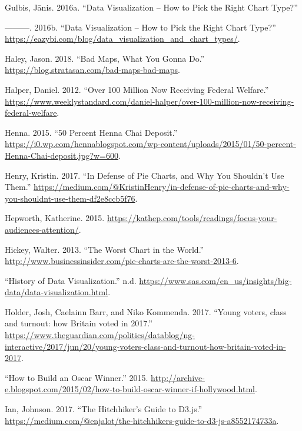 \documentclass[]{book}
\begin{document}
\leavevmode\hypertarget{ref-chart_selection}{}%
Gulbis, Jānis. 2016a. ``Data Visualization -- How to Pick the Right Chart Type?''

\leavevmode\hypertarget{ref-pick_chart}{}%
---------. 2016b. ``Data Visualization -- How to Pick the Right Chart Type?'' \url{https://eazybi.com/blog/data_visualization_and_chart_types/}.

\leavevmode\hypertarget{ref-good_bad_maps_tips}{}%
Haley, Jason. 2018. ``Bad Maps, What You Gonna Do.'' \url{https://blog.stratasan.com/bad-maps-bad-maps}.

\leavevmode\hypertarget{ref-halper_2012}{}%
Halper, Daniel. 2012. ``Over 100 Million Now Receiving Federal Welfare.'' \url{https://www.weeklystandard.com/daniel-halper/over-100-million-now-receiving-federal-welfare}.

\leavevmode\hypertarget{ref-50-percent-Henna-Chai}{}%
Henna. 2015. ``50 Percent Henna Chai Deposit.'' \url{https://i0.wp.com/hennablogspot.com/wp-content/uploads/2015/01/50-percent-Henna-Chai-deposit.jpg?w=600}.

\leavevmode\hypertarget{ref-henry-defense-pie}{}%
Henry, Kristin. 2017. ``In Defense of Pie Charts, and Why You Shouldn't Use Them.'' \url{https://medium.com/@KristinHenry/in-defense-of-pie-charts-and-why-you-shouldnt-use-them-df2e8ccb5f76}.

\leavevmode\hypertarget{ref-kathep}{}%
Hepworth, Katherine. 2015. \url{https://kathep.com/tools/readings/focus-your-audiences-attention/}.

\leavevmode\hypertarget{ref-hickey-pie-worst}{}%
Hickey, Walter. 2013. ``The Worst Chart in the World.'' \url{http://www.businessinsider.com/pie-charts-are-the-worst-2013-6}.

\leavevmode\hypertarget{ref-data_viz_importance2}{}%
``History of Data Visualization.'' n.d. \url{https://www.sas.com/en_us/insights/big-data/data-visualization.html}.

\leavevmode\hypertarget{ref-UKvotes2017}{}%
Holder, Josh, Caelainn Barr, and Niko Kommenda. 2017. ``Young voters, class and turnout: how Britain voted in 2017.'' \url{https://www.theguardian.com/politics/datablog/ng-interactive/2017/jun/20/young-voters-class-and-turnout-how-britain-voted-in-2017}.

\leavevmode\hypertarget{ref-oscars_sowhite_chart}{}%
``How to Build an Oscar Winner.'' 2015. \url{http://archive-e.blogspot.com/2015/02/how-to-build-oscar-winner-if-hollywood.html}.

\leavevmode\hypertarget{ref-Medium}{}%
Ian, Johnson. 2017. ``The Hitchhiker's Guide to D3.js.'' \url{https://medium.com/@enjalot/the-hitchhikers-guide-to-d3-js-a8552174733a}.
\end{document}
